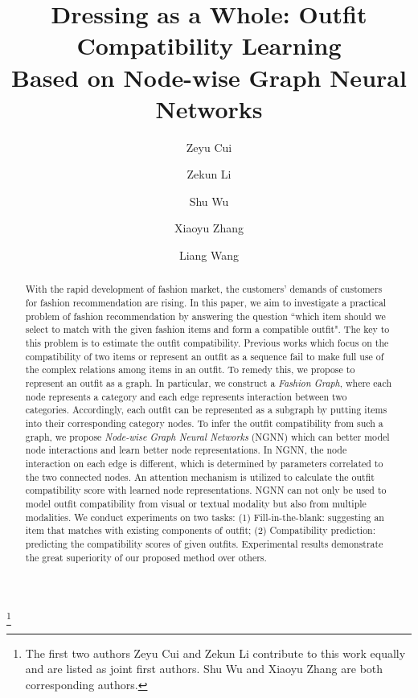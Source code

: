 \documentclass[sigconf]{acmart}
\begin{document}
\title{Dressing as a Whole: Outfit Compatibility Learning \\
Based on Node-wise Graph Neural Networks}
\author{Zeyu Cui}
\author{Zekun Li}
\author{Shu Wu}
\author{Xiaoyu Zhang}
\author{Liang Wang}
\thanks{The first two authors Zeyu Cui and Zekun Li contribute to this work equally and are listed as joint first authors.
Shu Wu and Xiaoyu Zhang are both corresponding authors.}







\begin{abstract}
With the rapid development of fashion market, the customers' demands of customers for fashion recommendation are rising. In this paper, we aim to investigate a practical problem of fashion recommendation by answering the question
``which item should we select to match with the given fashion items and form a compatible outfit".
The key to this problem is to estimate the outfit compatibility.
Previous works which focus on the compatibility of two items or represent an outfit as a sequence fail to make full use of the complex relations among items in an outfit.
 To remedy this, we propose to represent an outfit as a graph. In particular, we construct a \emph{Fashion Graph}, where each node represents a category
 and each edge represents interaction between two categories.
 Accordingly, each outfit can be represented as a subgraph by putting items into their corresponding category nodes.
 To infer the outfit compatibility from such a graph, we propose \emph{Node-wise Graph Neural Networks} (NGNN) which can better model node interactions and learn better node representations.
In NGNN, the node interaction on each edge is different, which is determined by parameters correlated to the two connected nodes.
An attention mechanism is utilized to calculate the outfit compatibility score with learned node representations.
NGNN can not only be used to model outfit compatibility from visual or textual modality but also from multiple modalities.
 We conduct experiments on two tasks: (1) Fill-in-the-blank:  suggesting an item that matches with existing components of outfit;
 (2) Compatibility prediction: predicting the compatibility scores of given outfits.
 Experimental results demonstrate the great superiority of our proposed method over others.

\end{abstract}
\end{document}
